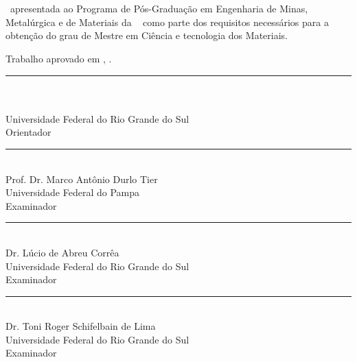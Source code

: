 \documentclass[
	12pt,				%
	openright,			%
	oneside,			%
	a4paper,			%
	english,			%
	french,				%
	spanish,			%
	brazil				%
	]{abntex2}
\begin{document}
\begin{folhadeaprovacao}


\begin{center}
     {\large \imprimirautor}\\
       	\vspace{2cm}	
    \begin{DoubleSpace}    
    {\large \textbf{\MakeUppercase{\imprimirtitulo}}} \\
    {\large \textbf{\MakeUppercase{\imprimirsubtitulo}}}
    \end{DoubleSpace}
		\vspace{1cm}
        
\end{center}		


\begin{flushright} 
    \parbox{0.6\linewidth}{
		\imprimirtipotrabalho~apresentada ao Programa de Pós-Graduação em Engenharia de Minas, Metalúrgica e de Materiais da \imprimirinstituicao~ como parte dos
		requisitos necessários para a obtenção do grau de Mestre em Ciência e tecnologia dos Materiais.\\}
   \end{flushright} 

\noindent Trabalho aprovado em \imprimirlocal, \imprimirdata. 

\begin{center}
\vfill
       \rule{10cm}{.1pt} \\
       {\imprimirorientador} \\ Universidade Federal do Rio Grande do Sul \\
			 Orientador 
       \vfill
       \rule{10cm}{.1pt} \\
       Prof. Dr. Marco Antônio Durlo Tier \\ Universidade Federal do Pampa \\
			  Examinador 
       \vfill
       \rule{10cm}{.1pt} \\
       Dr. Lúcio de Abreu Corrêa \\ Universidade Federal do Rio Grande do Sul \\
			 Examinador 
       \vfill
       \rule{10cm}{.1pt} \\
      Dr. Toni Roger Schifelbain de Lima \\ Universidade Federal do Rio Grande do Sul \\
			 Examinador 
       \vfill
  \end{center}
\end{folhadeaprovacao}
\end{document}
